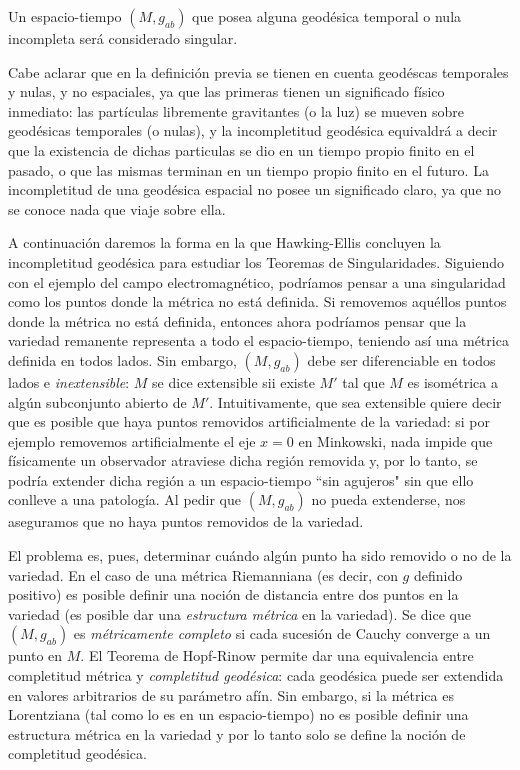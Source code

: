 \begin{definition}
Un espacio-tiempo $(M,g_{ab})$ que posea alguna geodésica temporal o nula incompleta será considerado singular.
\end{definition}


Cabe aclarar que en la definición previa se tienen en cuenta geodéscas temporales y nulas, y no espaciales, ya que las primeras tienen un significado físico inmediato: las partículas libremente gravitantes (o la luz) se mueven sobre geodésicas temporales (o nulas), y la incompletitud geodésica equivaldrá a decir que la existencia de dichas particulas se dio en un tiempo propio finito en el pasado, o que las mismas terminan en un tiempo propio finito en el futuro. La incompletitud de una geodésica espacial no posee un significado claro, ya que no se conoce nada que viaje sobre ella.


A continuación daremos la forma en la que Hawking-Ellis concluyen la incompletitud geodésica para estudiar los Teoremas de Singularidades. Siguiendo con el ejemplo del campo electromagnético, podríamos pensar a una singularidad como los puntos donde la métrica no está definida. Si removemos aquéllos puntos donde la métrica no está definida, entonces ahora podríamos pensar que la variedad remanente representa a todo el espacio-tiempo, teniendo así una métrica definida en todos lados. Sin embargo, $(M,g_{ab})$ debe ser diferenciable en todos lados e \textit{inextensible}: $M$ se dice extensible sii existe $M'$ tal que $M$ es isométrica a algún subconjunto abierto de $M'$. Intuitivamente, que sea extensible quiere decir que es posible que haya puntos removidos artificialmente de la variedad: si por ejemplo removemos artificialmente el eje $x=0$ en Minkowski, nada impide que físicamente un observador atraviese dicha región removida y, por lo tanto, se podría extender dicha región a un espacio-tiempo ``sin agujeros" sin que ello conlleve a una patología. Al pedir que $(M,g_{ab})$ no pueda extenderse, nos aseguramos que no haya puntos removidos de la variedad.


El problema es, pues, determinar cuándo algún punto ha sido removido o no de la variedad. En el caso de una métrica Riemanniana (es decir, con $g$ definido positivo) es posible definir una noción de distancia entre dos puntos en la variedad (es posible dar una \textit{estructura métrica} en la variedad). Se dice que $(M,g_{ab})$ es \textit{métricamente completo} si cada sucesión de Cauchy converge a un punto en $M$. El Teorema de Hopf-Rinow permite dar una equivalencia entre completitud métrica y \textit{completitud geodésica}: cada geodésica puede ser extendida en valores arbitrarios de su parámetro afín. Sin embargo, si la métrica es Lorentziana (tal como lo es en un espacio-tiempo) no es posible definir una estructura métrica en la variedad y por lo tanto solo se define la noción de completitud geodésica.

